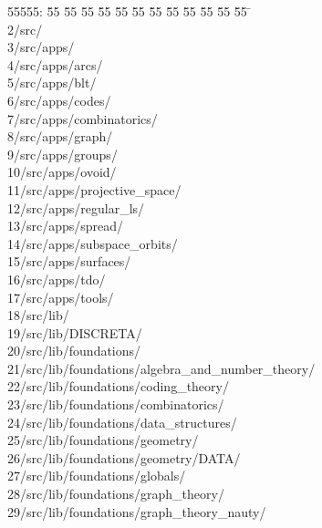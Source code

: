 %
%
\begin{tabbing}
55555: \= 55 \= 55 \= 55 \= 55 \= 55 \= 55 \= 55 \= 55 \= 55 \= 55 \= 55 \= 55 \= \>\\[0pt]
2\>/src/\\[0pt]
3\>/src/apps/\\[0pt]
4\>/src/apps/arcs/\\[0pt]
5\>/src/apps/blt/\\[0pt]
6\>/src/apps/codes/\\[0pt]
7\>/src/apps/combinatorics/\\[0pt]
8\>/src/apps/graph/\\[0pt]
9\>/src/apps/groups/\\[0pt]
10\>/src/apps/ovoid/\\[0pt]
11\>/src/apps/projective\_space/\\[0pt]
12\>/src/apps/regular\_ls/\\[0pt]
13\>/src/apps/spread/\\[0pt]
14\>/src/apps/subspace\_orbits/\\[0pt]
15\>/src/apps/surfaces/\\[0pt]
16\>/src/apps/tdo/\\[0pt]
17\>/src/apps/tools/\\[0pt]
18\>/src/lib/\\[0pt]
19\>/src/lib/DISCRETA/\\[0pt]
20\>/src/lib/foundations/\\[0pt]
21\>/src/lib/foundations/algebra\_and\_number\_theory/\\[0pt]
22\>/src/lib/foundations/coding\_theory/\\[0pt]
23\>/src/lib/foundations/combinatorics/\\[0pt]
24\>/src/lib/foundations/data\_structures/\\[0pt]
25\>/src/lib/foundations/geometry/\\[0pt]
26\>/src/lib/foundations/geometry/DATA/\\[0pt]
27\>/src/lib/foundations/globals/\\[0pt]
28\>/src/lib/foundations/graph\_theory/\\[0pt]
29\>/src/lib/foundations/graph\_theory\_nauty/\\[0pt]

\end{tabbing}
